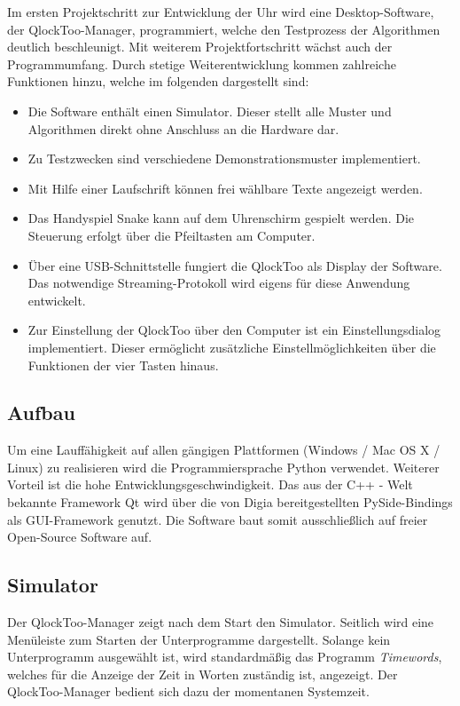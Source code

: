 \begin{multicols}{2}
Im ersten Projektschritt zur Entwicklung der Uhr wird eine Desktop-Software, der QlockToo-Manager, programmiert, welche den Testprozess der Algorithmen deutlich beschleunigt. Mit weiterem Projektfortschritt wächst auch der Programmumfang. Durch stetige Weiterentwicklung kommen zahlreiche Funktionen hinzu, welche im folgenden dargestellt sind:

\begin{itemize}

\item Die Software enthält einen Simulator. Dieser stellt alle Muster und Algorithmen direkt ohne Anschluss an die Hardware dar.
\item Zu Testzwecken sind verschiedene Demonstrationsmuster implementiert.
\item Mit Hilfe einer Laufschrift können frei wählbare Texte angezeigt werden.
\item Das Handyspiel Snake kann auf dem Uhrenschirm gespielt werden. Die Steuerung erfolgt über die Pfeiltasten am Computer.
\item Über eine USB-Schnittstelle fungiert die QlockToo als Display der Software. Das notwendige Streaming-Protokoll wird eigens für diese Anwendung entwickelt.
\item Zur Einstellung der QlockToo über den Computer ist ein Einstellungsdialog implementiert. Dieser ermöglicht zusätzliche Einstellmöglichkeiten über die Funktionen der vier Tasten hinaus.
\end{itemize}

\subsection{Aufbau}
Um eine Lauffähigkeit auf allen gängigen Plattformen (Windows / Mac OS X / Linux) zu realisieren wird die Programmiersprache Python verwendet. Weiterer Vorteil ist die hohe Entwicklungsgeschwindigkeit.
Das aus der C++ - Welt bekannte Framework Qt wird über die von Digia bereitgestellten PySide-Bindings als GUI-Framework genutzt. Die Software baut somit ausschließlich auf freier Open-Source Software auf.

\subsection{Simulator}
Der QlockToo-Manager zeigt nach dem Start den Simulator. Seitlich wird eine Menüleiste zum Starten der Unterprogramme dargestellt.
Solange kein Unterprogramm ausgewählt ist, wird standardmäßig das Programm \emph{Timewords}, welches für die Anzeige der Zeit in Worten zuständig ist, angezeigt. Der QlockToo-Manager bedient sich dazu der momentanen Systemzeit.


\end{multicols}
